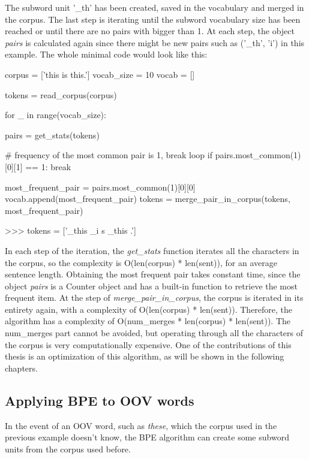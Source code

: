 The subword unit '\_th' has been created, saved in the vocabulary and merged in the corpus. The last step is iterating until the subword vocabulary size has been reached or until there are no pairs with bigger than 1. At each step, the object \emph{pairs} is calculated again since there might be new pairs such as ('\_th', 'i') in this example. The whole minimal code would look like this:

\begin{python}
corpus = ['this is this.']
vocab_size = 10
vocab = []

tokens = read_corpus(corpus)

for _ in range(vocab_size):

    pairs = get_stats(tokens)

    # frequency of the most common pair is 1, break loop
    if pairs.most_common(1)[0][1] == 1:
        break

    most_frequent_pair = pairs.most_common(1)[0][0]
    vocab.append(most_frequent_pair)
    tokens = merge_pair_in_corpus(tokens, most_frequent_pair)

>>> tokens = ['_this _i s _this .']
\end{python}

In each step of the iteration, the \emph{get\_stats} function iterates all the characters in the corpus, so the complexity is O(len(corpus) * len(sent)), for an average sentence length. Obtaining the most frequent pair takes constant time, since the object \emph{pairs} is a Counter object and has a built-in function to retrieve the most frequent item. At the step of \emph{merge\_pair\_in\_corpus}, the corpus is iterated in its entirety again, with a complexity of O(len(corpus) * len(sent)). Therefore, the algorithm has a complexity of O(num\_merges * len(corpus) * len(sent)). The num\_merges part cannot be avoided, but operating through all the characters of the corpus is very computationally expensive. One of the contributions of this thesis is an optimization of this algorithm, as will be shown in the following chapters.

\subsection{Applying BPE to OOV words}

In the event of an OOV word, such as \emph{these}, which the corpus used in the previous example doesn't know, the BPE algorithm can create some subword units from the corpus used before.

